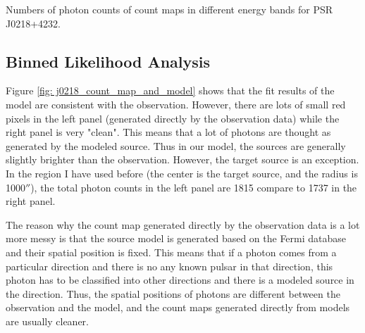 \documentclass[12pt]{report}
\newcommand{\mycaption}[1]{\protect \caption{#1}}
\begin{document}
          \begin{table}[!h]   
            \centering
            \mycaption{Numbers of photon counts of count maps in different energy bands for 
                  PSR J0218+4232.}
            \label{table:j0218_ccube_photon_counts}
          \end{table}
          \subsection{Binned Likelihood Analysis}
            Figure \ref{fig: j0218_count_map_and_model} shows that the fit results of the model 
            are consistent with the observation. However, there are lots of small red pixels 
            in the left panel (generated directly by the observation data) while the 
            right panel is very "clean". This means that a lot of photons are thought as 
            generated by the modeled source. Thus in our model, the sources are generally 
            slightly brighter than the observation. However, the target
            source is an exception. In the region I have used before (the center is the 
            target source, and the radius is 1000$''$), the total photon counts in the left 
            panel are 1815 compare to 1737 in the right panel. 

            The reason why the count map generated directly by the observation data is a lot 
            more messy is that the source model is generated based on the Fermi database 
            and their spatial position is fixed. This means that if 
            a photon comes from a particular direction and there is no any known pulsar in 
            that direction, this photon has to be classified into other directions and there 
            is a modeled source in the direction.  Thus, the spatial positions of photons are 
            different between the observation and the model, and the count maps generated 
            directly from models are usually cleaner. 
            
\end{document}

